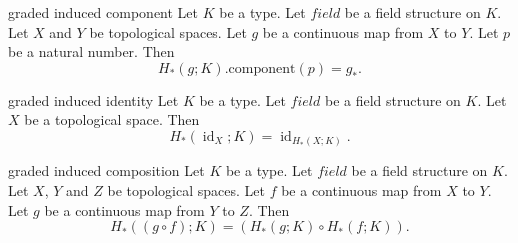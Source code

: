 \begin{cleanresult}{graded induced component}
Let $K$ be a type.
Let $\mathit{field}$ be a field structure on $K$.
Let $X$ and $Y$ be topological spaces.
Let $g$ be a continuous map from $X$ to $Y$.
Let $p$ be a natural number.
Then \[H_*(g;K).\mathrm{component}(p) = {g}_*.\]
\end{cleanresult}

\begin{cleanresult}{graded induced identity}
Let $K$ be a type.
Let $\mathit{field}$ be a field structure on $K$.
Let $X$ be a topological space.
Then \[H_*(\operatorname{id}_{X};K) = \operatorname{id}_{H_*(X;K)}.\]
\par{}
\end{cleanresult}

\begin{cleanresult}{graded induced composition}
Let $K$ be a type.
Let $\mathit{field}$ be a field structure on $K$.
Let $X$, $Y$ and $Z$ be topological spaces.
Let $f$ be a continuous map from $X$ to $Y$.
Let $g$ be a continuous map from $Y$ to $Z$.
Then \[H_*(\left(g \circ f\right);K) = (H_*(g;K) \circ H_*(f;K)).\]
\par{}
\end{cleanresult}

